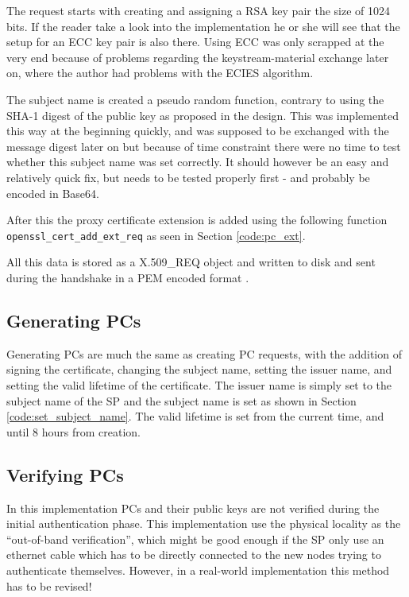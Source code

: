 The request starts with creating and assigning a RSA key pair the size of 1024
bits. If the reader take a look into the implementation he or she will see that
the setup for an \ac{ECC} key pair is also there. Using ECC was only scrapped
at the very end because of problems regarding the keystream-material exchange
later on, where the author had problems with the ECIES algorithm.

The subject name is created a pseudo random function, contrary to using the
SHA-1 digest of the public key as proposed in the design. This was implemented
this way at the beginning quickly, and was supposed to be exchanged with the
message digest later on but because of time constraint there were no time to
test whether this subject name was set correctly. It should however be an easy
and relatively quick fix, but needs to be tested properly first - and probably
be encoded in Base64.

After this the proxy certificate extension is added using the following
function\\\texttt{openssl\_cert\_add\_ext\_req} as seen in Section
\ref{code:pc_ext}.

All this data is stored as a X.509\_REQ object and written to disk and sent
during the handshake in a PEM encoded format \cite{rfc1421}.

\subsection{Generating PCs}
Generating PCs are much the same as creating PC requests, with the addition of
signing the certificate, changing the subject name, setting the issuer name, and
setting the valid lifetime of the certificate. The issuer name is simply set to
the subject name of the \ac{SP} and the subject name is set as shown in Section
\ref{code:set_subject_name}. The valid lifetime is set from the current time,
and until 8 hours from creation.

\subsection{Verifying PCs}
In this implementation PCs and their public keys are not verified during the
initial authentication phase. This implementation use the physical locality as
the ``out-of-band verification'', which might be good enough if the SP only
use an ethernet cable which has to be directly connected to the new nodes trying
to authenticate themselves. However, in a real-world implementation this method
has to be revised!

